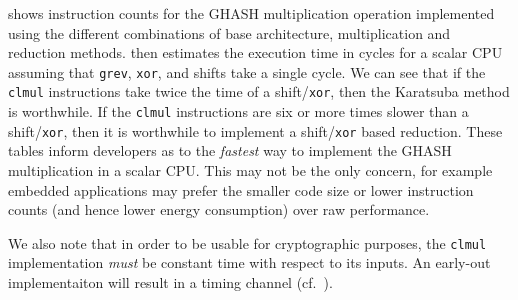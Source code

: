  shows instruction counts for the GHASH multiplication
operation implemented using the different combinations of base architecture,
multiplication and reduction methods.
 then estimates the execution time in cycles
for a scalar CPU assuming that {\tt grev}, {\tt xor}, and shifts take a
single cycle.
We can see that if the {\tt clmul} instructions take twice the time
of a shift/{\tt xor}, then the Karatsuba method is worthwhile.
If the {\tt clmul} instructions are six or more times slower than
a shift/{\tt xor}, then it is worthwhile to implement a shift/{\tt xor}
based reduction.
These tables inform developers as to the {\em fastest} way to implement
the GHASH multiplication in a scalar CPU.
This may not be the only concern, for example embedded applications may
prefer the smaller code size or lower instruction counts (and hence
lower energy consumption) over raw performance.

We also note that in order to be usable for cryptographic purposes, the
{\tt clmul} implementation {\em must} be constant time with respect
to its inputs.
An early-out implementaiton will result in a timing channel (cf.~\cite{GOPT:09}).

